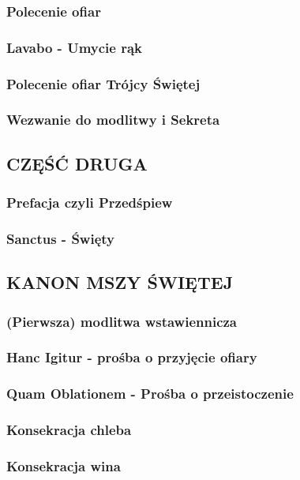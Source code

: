 \documentclass[10pt,titlepage]{article}
\begin{document}
	\subsubsection{Polecenie ofiar}
	\subsubsection{Lavabo - Umycie rąk}
	\subsubsection{Polecenie ofiar Trójcy Świętej}
	\subsubsection{Wezwanie do modlitwy i Sekreta}
	
	\subsection{CZĘŚĆ DRUGA}
	
	\subsubsection{Prefacja czyli Przedśpiew}
	\subsubsection{Sanctus - Święty}
	
	\subsection{KANON MSZY ŚWIĘTEJ}
	
	\subsubsection{(Pierwsza) modlitwa wstawiennicza}
	\subsubsection{Hanc Igitur - prośba o przyjęcie ofiary}
	\subsubsection{Quam Oblationem - Prośba o przeistoczenie}
	\subsubsection{Konsekracja chleba}
	\subsubsection{Konsekracja wina}
\end{document}
